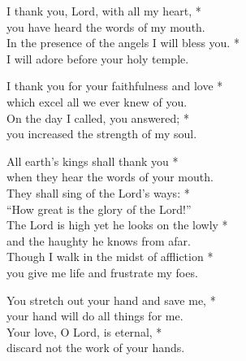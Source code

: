 I thank you, Lord, with all my heart, *\\
you have heard the words of my mouth.\\
In the presence of the angels I will bless you. *\\
I will adore before your holy temple.

I thank you for your faithfulness and love *\\
which excel all we ever knew of you.\\
On the day I called, you answered; *\\
you increased the strength of my soul.

All earth’s kings shall thank you *\\
when they hear the words of your mouth.\\
They shall sing of the Lord’s ways: *\\
“How great is the glory of the Lord!”\\

The Lord is high yet he looks on the lowly *\\
and the haughty he knows from afar.\\
Though I walk in the midst of affliction *\\
you give me life and frustrate my foes.

You stretch out your hand and save me, *\\
your hand will do all things for me.\\
Your love, O Lord, is eternal, *\\
discard not the work of your hands.